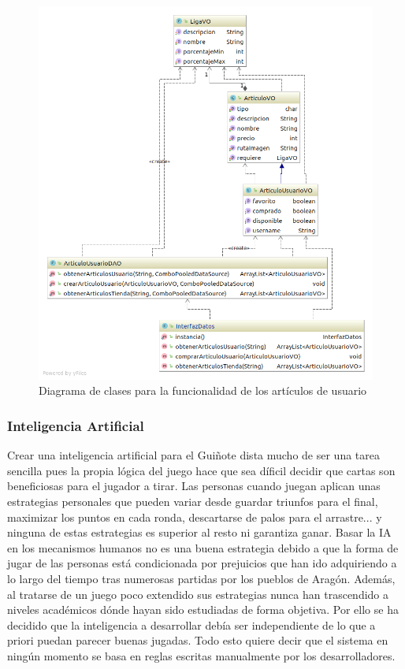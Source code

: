 \begin{figure}[H]
\centering
\includegraphics[scale = 0.5]{figuras/base_datos/clasesArticuloUsuario.png}
\caption{Diagrama de clases para la funcionalidad de los artículos de usuario}
\label{fig:diagramaClasesArticuloUsuario}
\end{figure}

\subsubsection{Inteligencia Artificial}
Crear una inteligencia artificial para el Guiñote dista mucho de ser una tarea sencilla pues la propia lógica del juego hace que sea díficil decidir que cartas son beneficiosas para el jugador a tirar. Las personas cuando juegan aplican unas estrategias personales que pueden variar desde guardar triunfos para el final, maximizar los puntos en cada ronda, descartarse de palos para el arrastre... y ninguna de estas estrategias es superior al resto ni garantiza ganar. Basar la IA en los mecanismos humanos no es una buena estrategia debido a que la forma de jugar de las personas está condicionada por prejuicios que han ido adquiriendo a lo largo del tiempo tras numerosas partidas por los pueblos de Aragón. Además, al tratarse de un juego poco extendido sus estrategias nunca han trascendido a niveles académicos dónde hayan sido estudiadas de forma objetiva. Por ello se ha decidido que la inteligencia a desarrollar debía ser independiente de lo que a priori puedan parecer buenas jugadas. Todo esto quiere decir que el sistema en ningún momento se basa en reglas escritas manualmente por los desarrolladores.\\

